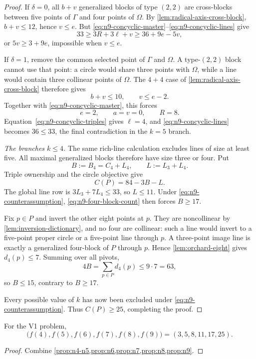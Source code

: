 \begin{proof}
If \(\delta=0\), all \(b+v\) generalized blocks of type \((2,2)\)
are cross-blocks between five points of \(\Gamma\) and four points of
\(\Omega\).  By \cref{lem:radical-axis-cross-block},
\(b+v\leq12\), hence \(v\leq e\).  But
\eqref{eq:n9-concyclic-master}--\eqref{eq:n9-concyclic-lines} give
\[
 33\geq3R+3\ell+v\geq36+9e-5v,
\]
or \(5v\geq3+9e\), impossible when \(v\leq e\).

If \(\delta=1\), remove the common selected point of \(\Gamma\) and
\(\Omega\).  A type-\((2,2)\) block cannot use that point: a circle would
share three points with \(\Omega\), while a line would contain three
collinear points of \(\Omega\).  The \(4+4\) case of
\cref{lem:radical-axis-cross-block} therefore gives
\[
 b+v\leq10,\qquad v\leq e-2.
\]
Together with \eqref{eq:n9-concyclic-master}, this forces
\[
 e=2,\qquad a=v=0,\qquad R=8.
\]
Equation~\eqref{eq:n9-concyclic-triples} gives \(\ell=4\), and
\eqref{eq:n9-concyclic-lines} becomes \(36\leq33\), the final
contradiction in the \(k=5\) branch.

\smallskip
\noindent\emph{The branches \(k\leq4\).}
The same rich-line calculation excludes lines of size at least five.
All maximal generalized blocks therefore have size three or four.  Put
\[
 B:=B_4=C_4+L_4,\qquad L:=L_3+L_4.
\]
Triple ownership and the circle objective give
\begin{equation}\label{eq:n9-four-block-count}
 C(P)=84-3B-L.
\end{equation}
The global line row is \(3L_3+7L_4\leq33\), so \(L\leq11\).
Under \eqref{eq:n9-counterassumption},
\eqref{eq:n9-four-block-count} then forces \(B\geq17\).

Fix \(p\in P\) and invert the other eight points at \(p\).  They are
noncollinear by \cref{lem:inversion-dictionary}, and no four are collinear:
such a line would invert to a five-point proper circle or a five-point
line through \(p\).  A three-point image line is exactly a generalized
four-block of \(P\) through \(p\).  Hence
\cref{lem:orchard-eight} gives \(d_4(p)\leq7\).  Summing over all pivots,
\[
 4B=\sum_{p\in P}d_4(p)\leq9\cdot7=63,
\]
so \(B\leq15\), contrary to \(B\geq17\).

Every possible value of \(k\) has now been excluded under
\eqref{eq:n9-counterassumption}.  Thus \(C(P)\geq25\), completing the
proof.
\end{proof}

\begin{theorem}\label{thm:small-values}
For the V1 problem,
\[
 \bigl(f(4),f(5),f(6),f(7),f(8),f(9)\bigr)
   =(3,5,8,11,17,25).
\]
\end{theorem}

\begin{proof}
Combine \cref{prop:n4-n5,prop:n6,prop:n7,prop:n8,prop:n9}.
\end{proof}
